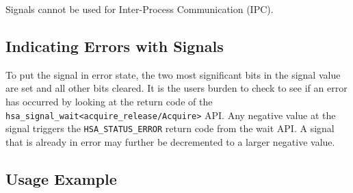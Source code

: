 Signals cannot be used for Inter-Process Communication (IPC).

\hypertarget{signal_error}{} \subsection{ Indicating Errors with
Signals} \label{signal_error}
To put the signal in error state, the two most significant bits in
the signal value are set and all other bits cleared. It is the users
burden to check to see if an error has occurred by looking at the
return code of the
\texttt{hsa\_signal\_wait<acquire\_release/Acquire>} API. Any
negative value at the signal triggers the
\texttt{HSA\_STATUS\_ERROR} return code from the wait API. A signal
that is already in error may further be decremented to a larger
negative value. 

\hypertarget{signal_example}{} \subsection{Usage Example}
\label{signal_example}
